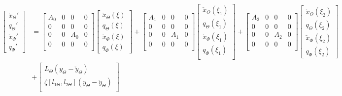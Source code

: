 \documentclass[../main.tex]{subfiles}
\begin{document}
	\begin{align}
	\begin{bmatrix}
	\check{x}_\Theta' \\
	q_\Theta' \\
	\check{x}_\Phi'\\
	q_\Phi'
	\end{bmatrix} &=
	\begin{bmatrix}
	A_0 & 0 & 0 & 0\\
	0 & 0 & 0 & 0\\
	0 & 0 & A_0 & 0 \\
	0 & 0 & 0 & 0 \\
	\end{bmatrix}
	\begin{bmatrix}
	\check{x}_\Theta(\xi) \\
	q_\Theta(\xi) \\
	\check{x}_\Phi(\xi) \\
	q_\Phi (\xi)
	\end{bmatrix} + 
	\begin{bmatrix}
	A_1 & 0 & 0 & 0\\
	0 & 0 & 0 & 0\\
	0 & 0 & A_1 & 0 \\
	0 & 0 & 0 & 0 \\
	\end{bmatrix}
	\begin{bmatrix}
	\check{x}_\Theta(\xi_1) \\
	q_\Theta(\xi_1) \\
	\check{x}_\Phi(\xi_1) \\
	q_\Phi(\xi_1) \\
	\end{bmatrix} +
	\begin{bmatrix}
	A_2 & 0 & 0 & 0\\
	0 & 0 & 0 & 0\\
	0 & 0 & A_2 & 0 \\
	0 & 0 & 0 & 0 \\
	\end{bmatrix}
	\begin{bmatrix}
	\check{x}_\Theta(\xi_2) \\
	q_\Theta(\xi_2) \\
	\check{x}_\Phi(\xi_2) \\
	q_\Phi(\xi_2) 
	\end{bmatrix} \nonumber\\
	&+
	\begin{bmatrix}
	L_\Theta(y_{\Theta} - \check{y}_{\Theta})\\
	\zeta[l_{1\Theta},l_{2\Theta}](y_\Theta - \check{y}_\Theta) \\

\end{bmatrix}
\end{align}
\end{document}
